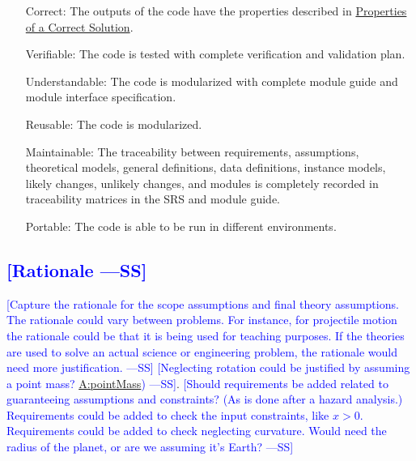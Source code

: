 \documentclass[12pt]{article}
\newcommand{\authornote}[3]{\textcolor{#1}{[#3 ---#2]}}
\newcommand{\authornote}[3]{}
\newcommand{\wss}[1]{\authornote{blue}{SS}{#1}}
\begin{document}
\begin{itemize}
\item[Correct:\phantomsection\label{correct}]{The outputs of the code have the properties described in \hyperref[Sec:CorSolProps]{Properties of a Correct Solution}.}
\item[Verifiable:\phantomsection\label{verifiable}]{The code is tested with complete verification and validation plan.}
\item[Understandable:\phantomsection\label{understandable}]{The code is modularized with complete module guide and module interface specification.}
\item[Reusable:\phantomsection\label{reusable}]{The code is modularized.}
\item[Maintainable:\phantomsection\label{maintainable}]{The traceability between requirements, assumptions, theoretical models, general definitions, data definitions, instance models, likely changes, unlikely changes, and modules is completely recorded in traceability matrices in the SRS and module guide.}
\item[Portable:\phantomsection\label{portable}]{The code is able to be run in different environments.}
\end{itemize}
\subsection{\wss{Rationale}}
\wss{Capture the rationale for the scope assumptions and final theory
assumptions.  The rationale could vary between problems.  For instance, for
projectile motion the rationale could be that it is being used for teaching
purposes.  If the theories are used to solve an actual science or engineering
problem, the rationale would need more justification.}
\wss{Neglecting rotation could be justified by assuming a point mass? \hyperref[pointMass]{A:pointMass})}.
\wss{Should requirements be added related to guaranteeing assumptions and
constraints?  (As is done after a hazard analysis.)  Requirements could be added
to check the input constraints, like $x > 0$. Requirements could be added to
check neglecting curvature.  Would need the radius of the planet, or are we
assuming it's Earth?}
\end{document}
